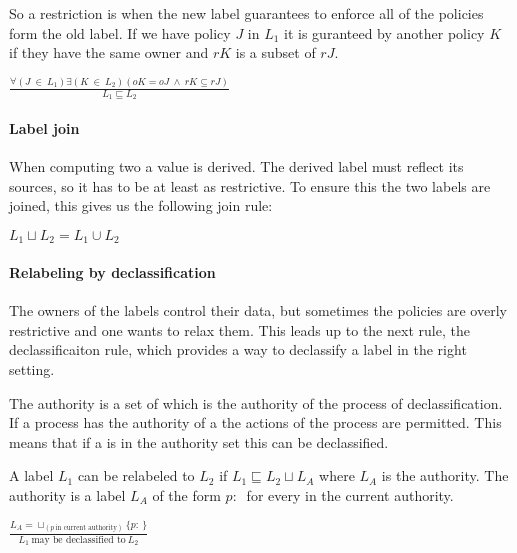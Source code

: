 So a restriction is when the new label guarantees to enforce all of the policies form the old label.
If we have policy $J$ in $L_1$ it is guranteed by another policy $K$ if they have the same owner and $rK$ is a subset of $rJ$.
\begin{center}
$\frac{\forall (J \ \in \ L_1) \exists (K \ \in \ L_2)(oK = oJ \ \wedge \ rK \subseteq rJ)}{L_1 \sqsubseteq L_2}$
\end{center}

\paragraph{Label join}
When computing two \xvalues{} a value is derived.
The derived \xvalues{} label must reflect its sources, so it has to be at least as restrictive.
To ensure this the two labels are joined, this gives us the following join rule:
\begin{center}
  $L_1 \sqcup L_2 = L_1 \cup L_2$
\end{center}

\paragraph{Relabeling by declassification}
The owners of the labels control their data, but sometimes the policies are overly restrictive and one wants to relax them.
This leads up to the next rule, the declassificaiton rule, which provides a way to declassify a label in the right setting.

The authority is a set of \principals{} which is the authority of the process of declassification.
If a process has the authority of a \principal{} the actions of the process are permitted.
This means that if a \principal{} is in the authority set this can be declassified.

A label $L_1$ can be relabeled to $L_2$ if $L_1 \sqsubseteq L_2 \sqcup L_A$ where $L_A$ is the authority.
The authority is a label $L_A$ of the form ${p: \ }$ for every \principal{} in the current authority.

\begin{center}
  $\frac{L_A = \sqcup_{(p \  \mbox{in current authority})}\{p: \ \}}{L_1 \ \mbox{may be declassified to} \ L_2}$
\end{center}

